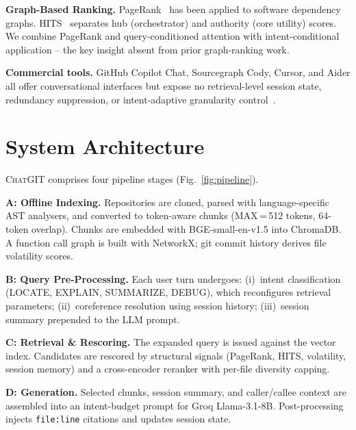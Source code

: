\documentclass[conference]{IEEEtran}
\newcommand{\chatgit}{\textsc{ChatGIT}\xspace}
\begin{document}
\textbf{Graph-Based Ranking.} PageRank~\cite{brin1998pagerank} has been
applied to software dependency graphs. HITS~\cite{kleinberg1999hits}
separates hub (orchestrator) and authority (core utility) scores.
We combine PageRank and query-conditioned attention with intent-conditional
application -- the key insight absent from prior graph-ranking work.

\textbf{Commercial tools.} GitHub Copilot Chat, Sourcegraph Cody, Cursor,
and Aider all offer conversational interfaces but expose no
retrieval-level session state, redundancy suppression, or intent-adaptive
granularity control~\cite{githubcopilot,cody,cursor,aider}.

\section{System Architecture}

\chatgit comprises four pipeline stages (Fig.~\ref{fig:pipeline}).

\textbf{A: Offline Indexing.} Repositories are cloned, parsed with
language-specific AST analysers, and converted to token-aware chunks
(MAX\,=\,512 tokens, 64-token overlap). Chunks are embedded with
BGE-small-en-v1.5 into ChromaDB. A function call graph is built with
NetworkX; git commit history derives file volatility scores.

\textbf{B: Query Pre-Processing.} Each user turn undergoes:
(i)~intent classification (LOCATE, EXPLAIN, SUMMARIZE, DEBUG), which
reconfigures retrieval parameters; (ii)~coreference resolution using
session history; (iii)~session summary prepended to the LLM prompt.

\textbf{C: Retrieval \& Rescoring.} The expanded query is issued
against the vector index. Candidates are rescored by structural signals
(PageRank, HITS, volatility, session memory) and a cross-encoder
reranker with per-file diversity capping.

\textbf{D: Generation.} Selected chunks, session summary, and
caller/callee context are assembled into an intent-budget prompt for
Groq Llama-3.1-8B. Post-processing injects \texttt{file:line} citations
and updates session state.
\end{document}
